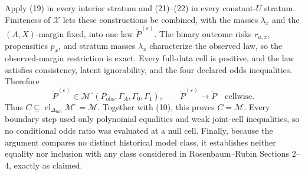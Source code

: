 Apply (19) in every interior stratum and (21)--(22) in every constant-\(U\) stratum.  Finiteness of \(\mathcal X\) lets these constructions be combined, with the masses \(\lambda_x\) and the \((A,X)\)-margin fixed, into one law \(\widetilde P^{(\varepsilon)}\).  The binary outcome risks \(r_{a,x}\), propensities \(p_x\), and stratum masses \(\lambda_x\) characterize the observed law, so the observed-margin restriction is exact.  Every full-data cell is positive, and the law satisfies consistency, latent ignorability, and the four declared odds inequalities.  Therefore
\[
\widetilde P^{(\varepsilon)}
\in\mathcal M^{\circ}(P_{\mathrm{obs}},\Gamma_A,\Gamma_0,\Gamma_1),
\qquad
\widetilde P^{(\varepsilon)}\longrightarrow\widetilde P
\quad\text{cellwise}.                                    \tag{23}
\]
Thus \(C\subseteq\operatorname{cl}_{\Delta_{\mathrm{full}}}\mathcal M^{\circ}=\mathcal M\).  Together with (10), this proves \(C=\mathcal M\).  Every boundary step used only polynomial equalities and weak joint-cell inequalities, so no conditional odds ratio was evaluated at a null cell.  Finally, because the argument compares no distinct historical model class, it establishes neither equality nor inclusion with any class considered in Rosenbaum--Rubin Sections 2--4, exactly as claimed.
